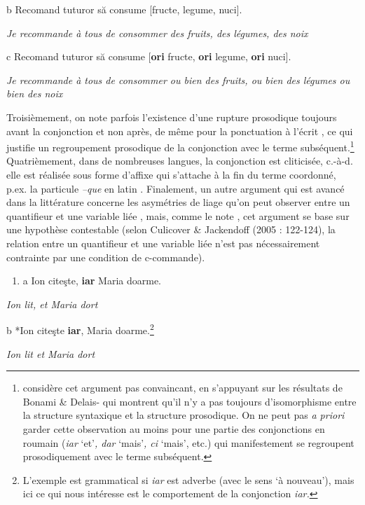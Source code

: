   b  Recomand tuturor să consume [fructe, legume, nuci].

{\itshape
Je recommande à tous de consommer des fruits, des légumes, des noix}

  c  Recomand tuturor să consume [\textbf{ori} fructe, \textbf{ori} legume, \textbf{ori} nuci].

{\itshape
Je recommande à tous de consommer ou bien des fruits, ou bien des légumes ou bien des noix}

Troisièmement, on note parfois l'existence d'une rupture prosodique toujours avant la conjonction et non après, de même pour la ponctuation à l'écrit , ce qui justifie un regroupement prosodique de la conjonction avec le terme subséquent.\footnote{\citet{Mouret2007} considère cet argument pas convaincant, en s'appuyant sur les résultats de Bonami \& Delais-\citet{Roussarie2006} qui montrent qu'il n'y a pas toujours d'isomorphisme entre la structure syntaxique et la structure prosodique. On ne peut pas \textit{a priori} garder cette observation au moins pour une partie des conjonctions en roumain (\textit{iar} `et'\textit{, dar} `mais'\textit{, ci} `mais', etc.) qui manifestement se regroupent prosodiquement avec le terme subséquent. }  Quatrièmement, dans de nombreuses langues, la conjonction est cliticisée, c.-à-d. elle est réalisée sous forme d'affixe qui s'attache à la fin du terme coordonné, p.ex. la particule \textit{--que} en latin . Finalement, un autre argument qui est avancé dans la littérature concerne les asymétries de liage qu'on peut observer entre un quantifieur et une variable liée , mais, comme le note \citet[68]{Mouret2007}, cet argument se base sur une hypothèse contestable (selon Culicover \& Jackendoff (2005 : 122-124), la relation entre un quantifieur et une variable liée n'est pas nécessairement contrainte par une condition de c-commande).


\begin{enumerate}
\item \label{bkm:Ref301776855}a  Ion citeşte, {\textbar} \textbf{iar} Maria doarme.


\end{enumerate}
{\itshape
Ion lit, et Maria dort}

  b  *Ion citeşte \textbf{iar}, {\textbar} Maria doarme.\footnote{L'exemple est grammatical si \textit{iar} est adverbe (avec le sens `à nouveau'), mais ici ce qui nous intéresse est le comportement de la conjonction \textit{iar.} }

{\itshape
Ion lit et Maria dort}


